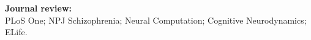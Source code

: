 

\textbf{Journal review:} \\
PLoS One; NPJ Schizophrenia; Neural Computation; Cognitive Neurodynamics; ELife.